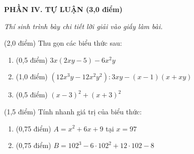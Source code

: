 \documentclass[12pt,a4paper]{article}
\begin{document}
\setcounter{ex}{0}
\noindent\textbf{\large PHẦN IV. TỰ LUẬN (3,0 điểm)}

\textit{Thí sinh trình bày chi tiết lời giải vào giấy làm bài.}

\vspace{1mm}
\begin{ex} (2,0 điểm)
Thu gọn các biểu thức sau:
\begin{enumerate}[label=\textbf{\alph*)}, leftmargin=0.8cm, itemsep=2pt]
\item (0,5 điểm) $3x(2xy - 5) - 6x^2y$
\item (1,0 điểm) $(12x^3y - 12x^2y^2) : 3xy - (x - 1)(x + xy)$
\item (0,5 điểm) $(x - 3)^2 + (x + 3)^2$
\end{enumerate}
\end{ex}
\vspace{0.5mm}

\begin{ex} (1,5 điểm)
Tính nhanh giá trị của biểu thức:
\begin{enumerate}[label=\textbf{\alph*)}, leftmargin=0.8cm, itemsep=2pt]
\item (0,75 điểm) $A = x^2 + 6x + 9$ tại $x = 97$
\item (0,75 điểm) $B = 102^3 - 6 \cdot 102^2 + 12 \cdot 102 - 8$
\end{enumerate}
\end{ex}
\vspace{0.5mm}
\end{document}
